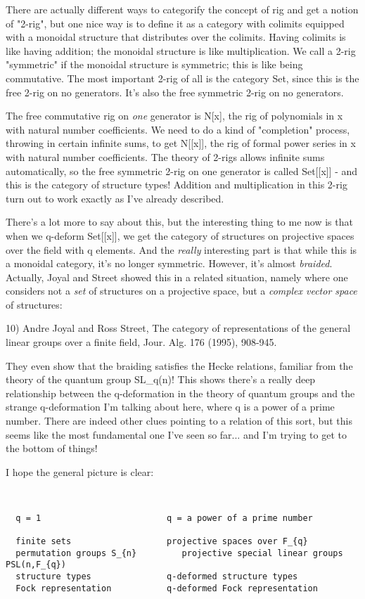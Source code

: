 There are actually different ways to categorify the concept of rig and
get a notion of "2-rig", but one nice way is to define it as a category
with colimits equipped with a monoidal structure that distributes over
the colimits.  Having colimits is like having addition; the monoidal
structure is like multiplication.  We call a 2-rig "symmetric" if the
monoidal structure is symmetric; this is like being commutative.  The
most important 2-rig of all is the category Set, since this is the free
2-rig on no generators.  It's also the free symmetric 2-rig on no
generators.

The free commutative rig on \emph{one} generator is N[x], the rig of 
polynomials in x with natural number coefficients.  We need to do a 
kind of "completion" process, throwing in certain infinite sums, to
get N[[x]], the rig of formal power series in x with natural number
coefficients.  The theory of 2-rigs allows infinite sums automatically,
so the free symmetric 2-rig on one generator is called Set[[x]] - and
this is the category of structure types!  Addition and multiplication
in this 2-rig turn out to work exactly as I've already described.  

There's a lot more to say about this, but the interesting thing to me
now is that when we q-deform Set[[x]], we get the category of structures
on projective spaces over the field with q elements.  And the \emph{really}
interesting part is that while this is a monoidal category, it's no
longer symmetric.  However, it's almost \emph{braided}.  Actually,
Joyal and Street showed this in a related situation, namely where one
considers not a \emph{set} of structures on a projective space, but a
\emph{complex vector space} of structures:

10) Andre Joyal and Ross Street, The category of representations of
the general linear groups over a finite field, Jour. Alg. 176 (1995),
908-945.

They even show that the braiding satisfies the Hecke relations, familiar
from the theory of the quantum group SL_{q}(n)!  This shows there's a
really deep relationship between the q-deformation in the theory of
quantum groups and the strange q-deformation I'm talking about here,
where q is a power of a prime number.  There are indeed other clues
pointing to a relation of this sort, but this seems like the most
fundamental one I've seen so far... and I'm trying to get to the 
bottom of things!  

I hope the general picture is clear:


\begin{verbatim}


  q = 1                         q = a power of a prime number    

  finite sets                   projective spaces over F_{q}
  permutation groups S_{n}         projective special linear groups PSL(n,F_{q})
  structure types               q-deformed structure types
  Fock representation           q-deformed Fock representation

\end{verbatim}
    
